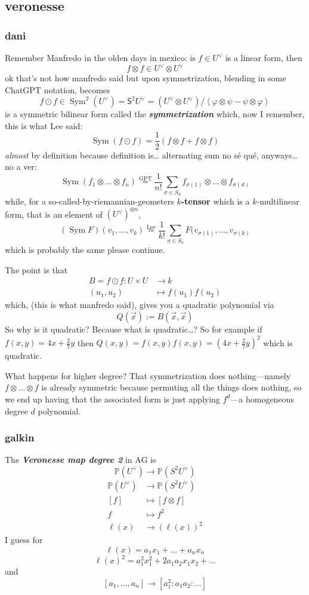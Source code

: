 \subsection{veronesse}
\subsubsection{dani}
Remember Manfredo in the olden days in mexico: is \(f \in U^\vee\) is a linear form, then
\[f \otimes f \in U^\vee \otimes U^\vee\]
ok that's not how manfredo said but upon symmetrization, blending in some ChatGPT notation, becomes
\[f \odot f\in \operatorname{Sym}^2(U^\vee)=\mathsf{S}^2U^\vee=(U^\vee\otimes U^\vee)/\left<\varphi \otimes \psi - \psi \otimes \varphi\right>\]
is a symmetric bilinear form called the \textit{\textbf{symmetrization}} which, now I remember, this is what Lee said:
\[\operatorname{Sym}(f  \odot f)=\frac{1}{2}(f\otimes f + f \otimes f)\]
\textit{almost} by definition because definition is… alternating sum no sé qué, anyways… no a ver:
\[\operatorname{Sym}(f_1 \otimes \ldots \otimes f_n)\overset{\text{GPT} }{=}\frac{1}{n!}\sum_{\sigma \in S_d}f_{\sigma(1)}\otimes \ldots \otimes f_{\sigma(d)}\]
while, for a so-called-by-riemannian-geometers \textbf{\(k\)-tensor} which is a  \(k\)-multilinear form, that is an element of \((U^{\vee})^{\otimes n}\),
\[(\operatorname{Sym}F)(v_1,\ldots,v_k)\overset{\text{Lee} }{=}\frac{1}{k!}\sum_{\sigma \in S_k}F(v_{\sigma(1)},\ldots,v_{\sigma(k)}\]
which is probably the same please continue.

The point is that
\begin{align*}
	B=f \odot f: U \times U &\longrightarrow k \\
	(u_1,u_2)&\longmapsto f(u_1)f(u_2)
\end{align*}
which, (this is what manfredo said), gives you a quadratic polynomial via
\[Q(\vec{x}):=B(\vec{x},\vec{x})\]
So why is it quadratic? Because what is quadratic…? So for example if \(f(x,y)=4x+\frac{2}{7}y\) then \(Q(x,y)=f(x,y)f(x,y)=(4x+\frac{2}{7}y)^2\) which is quadratic.

What happens for higher degree? That symmetrization does nothing---namely \(f \otimes \ldots \otimes f\) is already symmetric because permuting all the things does nothing, so we end up having that the associated form is just applying \(f^d\)---a homogeneous degree \(d\) polynomial.




\subsubsection{galkin}
The \textit{\textbf{Veronesse map degree 2}} in AG is 
\[\mathbb{P}(U^\vee) \to \mathbb{P}(S^2 U^\vee)\]
\begin{align*}
	\mathbb{P}(U^\vee ) &\longrightarrow \mathbb{P}(S^2U^\vee) \\
	[f] &\longmapsto [f \otimes f]\\
	f & \longmapsto f^2\\
	\ell(x) & \longrightarrow (\ell(x))^2
\end{align*}
I guess for
\[\ell(x)=a_1x_1+\ldots+a_nx_n\]
\[\ell(x)^2=a_1^2x_1^2+2a_1a_2x_1x_2+\ldots\]
and
\[[a_1,\ldots,a_n]\to [a_1^2:a_1a_2:\ldots]\]

